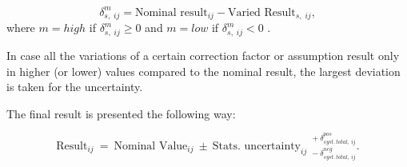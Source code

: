 \begin{equation}
 \delta_{s,\;ij}^{m} = \textrm{Nominal result}_{ij} - \textrm{Varied Result}_{s,\;ij}, 
\end{equation}
where $m = high$ if $\delta_{s,\;ij}^{m} \geq 0$ and $m = low$ if $\delta_{s,\;ij}^{m} < 0$ . 

In case all the variations of a certain correction factor or assumption result only in higher (or lower) values 
compared to the nominal result, the largest deviation is taken for the uncertainty.

The final result is presented the following way:

\begin{equation}
 \textrm{Result}_{ij}\: = \: \textrm{Nominal Value}_{ij}\: \pm \: \textrm{Stats. uncertainty}_{ij}\:\: { }^{+\:\delta_{syst.\,total,\:ij}^{pos}}_{-\:\delta_{syst.\,total,\:ij}^{neg}}.
\end{equation}

